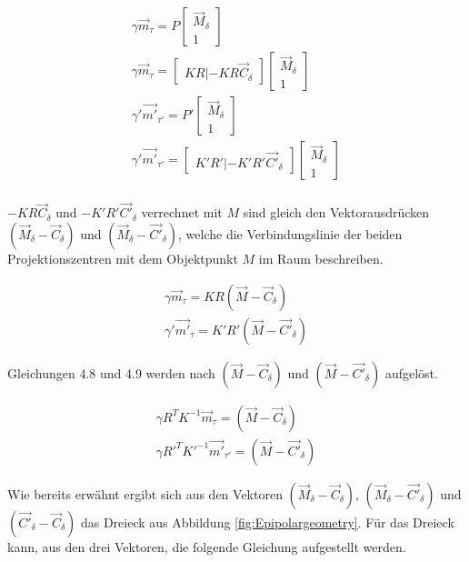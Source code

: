  \begin{gather}
 	\gamma\vec{m}_\tau = P \begin{bmatrix}\vec{M}_\delta\\1\end{bmatrix}\\
 	\gamma\vec{m}_\tau = \begin{bmatrix}KR|-KR\vec{C}_\delta\end{bmatrix}\begin{bmatrix}\vec{M}_\delta\\1\end{bmatrix}\\
 	\gamma'\vec{m'}_{\tau'} = P' \begin{bmatrix}\vec{M}_\delta\\1\end{bmatrix}\\
 	\gamma'\vec{m'}_{\tau'} = \begin{bmatrix}K'R'|-K'R'\vec{C'}_\delta\end{bmatrix}\begin{bmatrix}\vec{M}_\delta\\1\end{bmatrix}\\
 \end{gather}
 
 $-KR\vec{C}_\delta$ und $-K'R'\vec{C'}_\delta$ verrechnet mit $M$ sind gleich den Vektorausdrücken $(\vec{M}_\delta - \vec{C}_\delta)$ und $(\vec{M}_\delta - \vec{C'}_\delta)$, welche die Verbindungslinie der beiden Projektionszentren mit dem Objektpunkt $M$ im Raum beschreiben.
 
 \begin{gather}
 	\gamma\vec{m}_\tau = KR(\vec{M}-\vec{C}_\delta)\\
 	\gamma'\vec{m'}_\tau = K'R'(\vec{M}-\vec{C'}_\delta)
 \end{gather}
 
 Gleichungen 4.8 und 4.9 werden nach $(\vec{M}-\vec{C}_\delta)$ und $(\vec{M}-\vec{C'}_\delta)$ aufgelöst.
 
 \begin{gather}
 	\gamma R^TK^{-1}\vec{m}_\tau = (\vec{M}-\vec{C}_\delta)\\
 	\gamma R'^TK'^{-1}\vec{m'}_{\tau'} = (\vec{M}-\vec{C'}_\delta)
 \end{gather}
 
 Wie bereits erwähnt ergibt sich aus den Vektoren $(\vec{M}_\delta - \vec{C}_\delta),\, (\vec{M}_\delta - \vec{C'}_\delta)$ und $(\vec{C'}_\delta - \vec{C}_\delta)$ das Dreieck aus Abbildung \ref{fig:Epipolargeometry}. Für das Dreieck kann, aus den drei Vektoren, die folgende Gleichung aufgestellt werden. 
 
